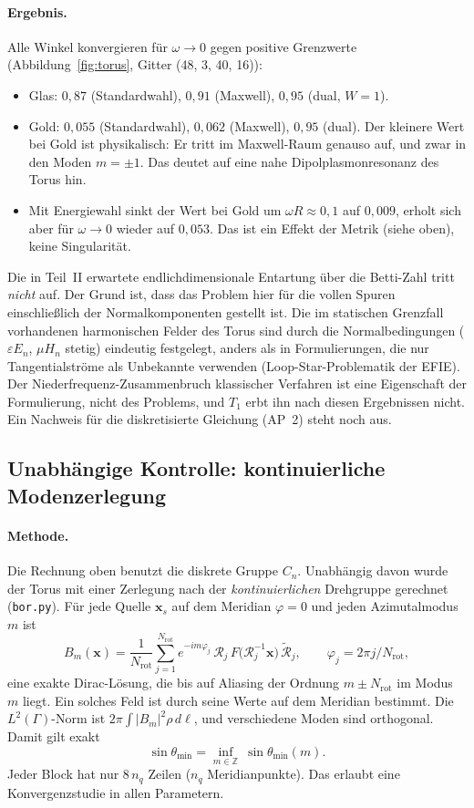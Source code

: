 \documentclass[11pt, a4paper]{article}
\newcommand{\mvec}[1]{\boldsymbol{#1}}
\theoremstyle{plain}
\theoremstyle{definition}
\begin{document}
\paragraph{Ergebnis.} Alle Winkel konvergieren für $\omega\to0$ gegen positive
Grenzwerte (Abbildung~\ref{fig:torus}, Gitter (48, 3, 40, 16)):
\begin{itemize}[leftmargin=*]
  \item Glas: $0{,}87$ (Standardwahl), $0{,}91$ (Maxwell), $0{,}95$ (dual, $W=1$).
  \item Gold: $0{,}055$ (Standardwahl), $0{,}062$ (Maxwell), $0{,}95$ (dual). Der kleinere
    Wert bei Gold ist physikalisch: Er tritt im Maxwell-Raum genauso auf, und zwar
    in den Moden $m=\pm1$. Das deutet auf eine nahe Dipolplasmonresonanz des Torus
    hin.
  \item Mit Energiewahl sinkt der Wert bei Gold um $\omega R\approx0{,}1$ auf
    $0{,}009$, erholt sich aber für $\omega\to0$ wieder auf $0{,}053$.
    Das ist ein Effekt der Metrik (siehe oben), keine Singularität.
\end{itemize}
Die in Teil~II erwartete endlichdimensionale Entartung über die Betti-Zahl tritt
\emph{nicht} auf. Der Grund ist, dass das Problem hier für die vollen Spuren
einschließlich der Normalkomponenten gestellt ist. Die im statischen Grenzfall
vorhandenen harmonischen Felder des Torus sind durch die Normalbedingungen
($\varepsilon E_n$, $\mu H_n$ stetig) eindeutig festgelegt, anders als in
Formulierungen, die nur Tangentialströme als Unbekannte verwenden
(Loop-Star-Problematik der EFIE). Der Niederfrequenz-Zusammenbruch klassischer
Verfahren ist eine Eigenschaft der Formulierung, nicht des Problems, und $T_1$
erbt ihn nach diesen Ergebnissen nicht. Ein Nachweis für die diskretisierte
Gleichung (AP~2) steht noch aus.

\subsection{Unabhängige Kontrolle: kontinuierliche Modenzerlegung}\label{sec:bor}

\paragraph{Methode.} Die Rechnung oben benutzt die diskrete Gruppe $C_n$.
Unabhängig davon wurde der Torus mit einer Zerlegung nach der
\emph{kontinuierlichen} Drehgruppe gerechnet (\texttt{bor.py}). Für jede Quelle
$\mvec{x}_s$ auf dem Meridian $\varphi=0$ und jeden Azimutalmodus $m$ ist
\[
  B_m(\mvec{x}) = \frac{1}{N_{\mathrm{rot}}}\sum_{j=1}^{N_{\mathrm{rot}}}
  e^{-im\varphi_j}\,\mathcal{R}_j\,F\big(\mathcal{R}_j^{-1}\mvec{x}\big)\,\tilde{\mathcal{R}}_j,
  \qquad \varphi_j = 2\pi j/N_{\mathrm{rot}},
\]
eine exakte Dirac-Lösung, die bis auf Aliasing der Ordnung $m\pm N_{\mathrm{rot}}$ im
Modus $m$ liegt. Ein solches Feld ist durch seine Werte auf dem Meridian bestimmt.
Die $L^2(\Gamma)$-Norm ist $2\pi\int|B_m|^2\rho\,d\ell$, und verschiedene Moden sind
orthogonal. Damit gilt exakt
\[
  \sin\theta_{\min} = \inf_{m\in\mathbb{Z}}\ \sin\theta_{\min}(m).
\]
Jeder Block hat nur $8\,n_q$ Zeilen ($n_q$ Meridianpunkte). Das erlaubt eine
Konvergenzstudie in allen Parametern.
\end{document}
